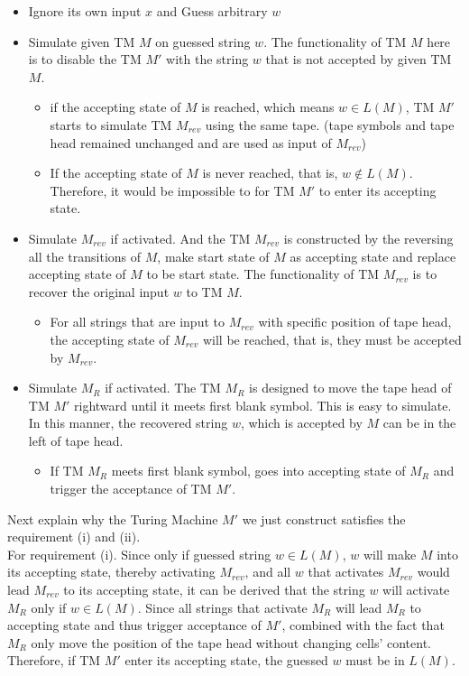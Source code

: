 \documentclass[11pt,a4paper]{article}
\newcommand{\htab}{\hspace*{0.63cm}}
\begin{document}
\begin{itemize}
    \item{Ignore its own input $x$ and Guess arbitrary $w$}
    \item{Simulate given TM $M$ on guessed string $w$. The functionality of TM $M$ here is to disable the 
            TM $M'$ with the string $w$ that is not accepted by given TM $M$.}
        \begin{itemize}
            \item{if the accepting state of $M$ is reached, which means $w \in L(M)$,
                    TM $M'$ starts to simulate TM $M_{rev}$ using the same tape. (tape symbols and tape 
                head remained unchanged and are used as input of $M_{rev}$)}
            \item{If the accepting state of $M$ is never reached, that is, $w \notin L(M)$. Therefore, it would be impossible to for TM $M'$ to enter its accepting state.}
        \end{itemize}
    \item{Simulate $M_{rev}$ if activated. And the TM $M_{rev}$ is constructed by the reversing all the transitions of $M$, make start state of $M$ as accepting state and replace accepting state of $M$ to be start state. The functionality of TM $M_{rev}$ is to recover the original input $w$ to TM $M$. }
        \begin{itemize}
            \item{For all strings that are input to $M_{rev}$ with specific position of tape head, the accepting state of $M_{rev}$ will be reached, that is, they must be accepted by $M_{rev}$.}
                \end{itemize}
            \item{Simulate $M_{R}$ if activated. The TM $M_{R}$ is designed to move the tape head of TM $M'$ rightward until it meets first blank symbol. This is easy to simulate. In this manner, the recovered string $w$, which is accepted by $M$ can be in the left of tape head.}
        \begin{itemize}
            \item{If TM $M_{R}$ meets first blank symbol, goes into 
                accepting state of $M_{R}$ and trigger the acceptance of TM $M'$.}
        \end{itemize}  \end{itemize} 
\htab Next explain why the Turing Machine $M'$ we just construct satisfies the requirement (i) and (ii).\\
\htab For requirement (i). Since only if guessed string $w \in L(M)$, $w$ will make $M$ into its accepting state, thereby activating $M_{rev}$, and all $w$ that activates $M_{rev}$ would lead $M_{rev}$ to its accepting state, it can be derived that the string $w$ will activate $M_{R}$ only if $w \in L(M)$. Since all strings that activate $M_{R}$ will lead $M_{R}$ to accepting state and thus trigger acceptance of $M'$, combined with the fact that  $M_{R}$ only move the position of the tape head without changing cells' content. Therefore, if TM $M'$ enter its accepting state, the guessed $w$ must be in $L(M)$.\\
\end{document}

